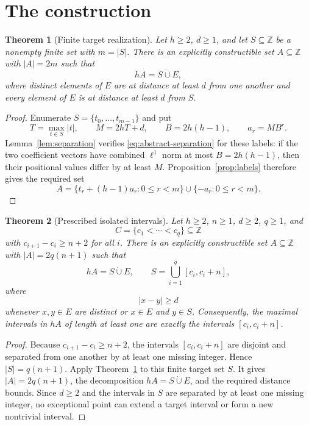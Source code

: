 \documentclass[11pt]{article}
\newtheorem{theorem}{Theorem}
\newcommand{\Z}{\mathbb{Z}}
\begin{document}
\section{The construction}

\begin{theorem}[Finite target realization]\label{thm:finite-target}
Let $h\geq 2$, $d\geq 1$, and let $S\subseteq\Z$ be a nonempty finite set
with $m=|S|$. There is an explicitly constructible set $A\subseteq\Z$ with
$|A|=2m$ such that
\[
 hA=S\mathbin{\dot\cup}E,
\]
where distinct elements of $E$ are at distance at least $d$ from one another
and every element of $E$ is at distance at least $d$ from $S$.
\end{theorem}

\begin{proof}
Enumerate $S=\{t_0,\ldots,t_{m-1}\}$ and put
\[
 T=\max_{t\in S}|t|,
 \qquad M=2hT+d,
 \qquad B=2h(h-1),
 \qquad a_r=MB^r.
\]
Lemma~\ref{lem:separation} verifies
\eqref{eq:abstract-separation} for these labels: if the two coefficient
vectors have combined $\ell^1$ norm at most $B=2h(h-1)$, then their
positional values differ by at least $M$. Proposition~\ref{prop:labels}
therefore gives the required set
\[
 A=\{t_r+(h-1)a_r:0\leq r<m\}\cup\{-a_r:0\leq r<m\}.
\]
\end{proof}

\begin{theorem}[Prescribed isolated intervals]\label{thm:main}
Let $h\geq 2$, $n\geq 1$, $d\geq 2$, $q\geq 1$, and
\[
 C=\{c_1<\cdots<c_q\}\subseteq\Z
\]
with $c_{i+1}-c_i\geq n+2$ for all $i$. There is an explicitly constructible
set $A\subseteq\Z$ with $|A|=2q(n+1)$ such that
\[
 hA=S\mathbin{\dot\cup}E,
 \qquad
 S=\bigcup_{i=1}^q[c_i,c_i+n],
\]
where
\[
 |x-y|\geq d
\]
whenever $x,y\in E$ are distinct or $x\in E$ and $y\in S$.
Consequently, the maximal intervals in $hA$ of length at least one are
exactly the intervals $[c_i,c_i+n]$.
\end{theorem}

\begin{proof}
Because $c_{i+1}-c_i\geq n+2$, the intervals $[c_i,c_i+n]$ are disjoint
and separated from one another by at least one missing integer. Hence
$|S|=q(n+1)$. Apply Theorem~\ref{thm:finite-target} to this finite target
set $S$. It gives $|A|=2q(n+1)$, the decomposition
$hA=S\mathbin{\dot\cup}E$, and the required distance bounds.
Since $d\geq 2$ and the intervals in $S$ are separated by at least one
missing integer, no exceptional point can extend a target interval or form a
new nontrivial interval.
\end{proof}
\end{document}
